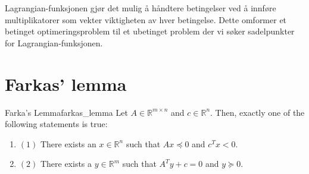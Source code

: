 Lagrangian-funksjonen gjør det mulig å håndtere betingelser ved å innføre multiplikatorer som vekter viktigheten av hver betingelse. Dette omformer et betinget optimeringsproblem til et ubetinget problem der vi søker sadelpunkter for Lagrangian-funksjonen.

\section{Farkas' lemma}

\begin{lemma}{Farka's Lemma}{farkas_lemma}
	Let \(A \in \mathbb{R}^{m \times n}\) and \(c \in \mathbb{R}^n\). Then, exactly one of the following statements is true:
	\begin{enumerate}
		\item[] \((1)\) There exists an \(x \in \mathbb{R}^n\) such that \(Ax \preceq 0\) and \(c^T x < 0\).
		\item[] \((2)\) There exists a \(y \in \mathbb{R}^m\) such that \(A^T y + c = 0\) and \(y \succeq 0\).
	\end{enumerate}
\end{lemma}

